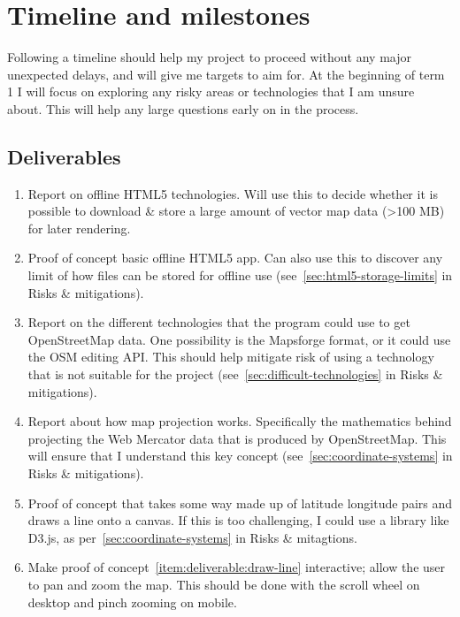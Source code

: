 \documentclass[]{final_report}
\begin{document}
\chapter{Timeline and milestones}

Following a timeline should help my project to proceed without any major unexpected delays, and will give me targets to aim for. At the beginning of term 1 I will focus on exploring any risky areas or technologies that I am unsure about. This will help any large questions early on in the process.

\section{Deliverables}

\begin{enumerate}
    \item Report on offline HTML5 technologies. Will use this to decide whether it is possible to download \& store a large amount of vector map data (>100 MB) for later rendering.\label{item:deliverable:offline-html}
    \item Proof of concept basic offline HTML5 app. Can also use this to discover any limit of how files can be stored for offline use (see~\ref{sec:html5-storage-limits} in Risks \& mitigations).\label{item:deliverable:basic-offline-app}
    \item Report on the different technologies that the program could use to get OpenStreetMap data. One possibility is the Mapsforge format, or it could use the OSM editing API\@. This should help mitigate risk of using a technology that is not suitable for the project (see~\ref{sec:difficult-technologies} in Risks \& mitigations).\label{item:deliverable:osm-data}
    \item Report about how map projection works. Specifically the mathematics behind projecting the Web Mercator data that is produced by OpenStreetMap. This will ensure that I understand this key concept (see~\ref{sec:coordinate-systems} in Risks \& mitigations).\label{item:deliverable:map-projection}
    \item Proof of concept that takes some way made up of latitude longitude pairs and draws a line onto a canvas. If this is too challenging, I could use a library like D3.js, as per~\ref{sec:coordinate-systems} in Risks \& mitagtions.\label{item:deliverable:draw-line}
    \item Make proof of concept~\ref{item:deliverable:draw-line} interactive; allow the user to pan and zoom the map. This should be done with the scroll wheel on desktop and pinch zooming on mobile.\label{item:deliverable:pan-zoom}

\end{enumerate}
\end{document}
